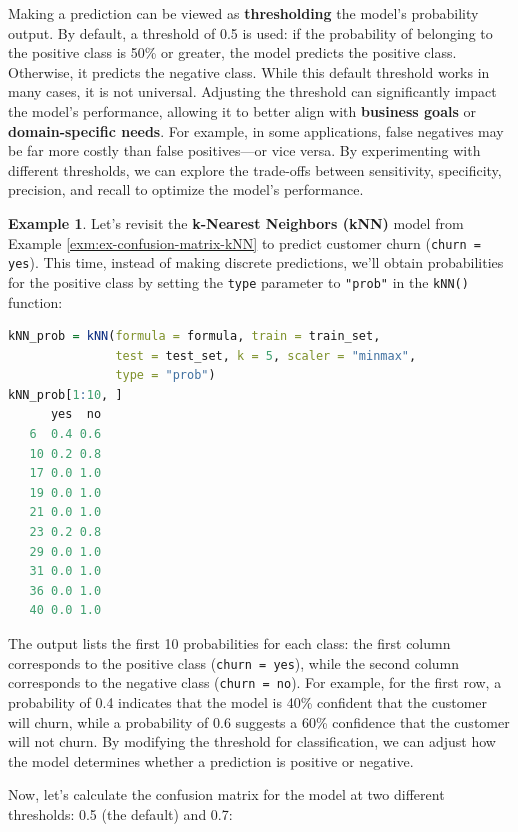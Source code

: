 \documentclass[
]{book}
\newcommand{\passthrough}[1]{#1}
\theoremstyle{definition}
\theoremstyle{definition}
\newtheorem{example}{Example}[chapter]
\theoremstyle{definition}
\theoremstyle{definition}
\theoremstyle{remark}
\begin{document}
Making a prediction can be viewed as \textbf{thresholding} the model's probability output. By default, a threshold of 0.5 is used: if the probability of belonging to the positive class is 50\% or greater, the model predicts the positive class. Otherwise, it predicts the negative class. While this default threshold works in many cases, it is not universal. Adjusting the threshold can significantly impact the model's performance, allowing it to better align with \textbf{business goals} or \textbf{domain-specific needs}. For example, in some applications, false negatives may be far more costly than false positives---or vice versa. By experimenting with different thresholds, we can explore the trade-offs between sensitivity, specificity, precision, and recall to optimize the model's performance.

\begin{example}
\protect\hypertarget{exm:ex-confusion-matrix-kNN-prob}{}\label{exm:ex-confusion-matrix-kNN-prob}Let's revisit the \textbf{k-Nearest Neighbors (kNN)} model from Example \ref{exm:ex-confusion-matrix-kNN} to predict customer churn (\passthrough{\lstinline!churn = yes!}). This time, instead of making discrete predictions, we'll obtain probabilities for the positive class by setting the \passthrough{\lstinline!type!} parameter to \passthrough{\lstinline!"prob"!} in the \passthrough{\lstinline!kNN()!} function:

\begin{lstlisting}[language=R]
kNN_prob = kNN(formula = formula, train = train_set, 
               test = test_set, k = 5, scaler = "minmax",
               type = "prob")
kNN_prob[1:10, ]
      yes  no
   6  0.4 0.6
   10 0.2 0.8
   17 0.0 1.0
   19 0.0 1.0
   21 0.0 1.0
   23 0.2 0.8
   29 0.0 1.0
   31 0.0 1.0
   36 0.0 1.0
   40 0.0 1.0
\end{lstlisting}

The output lists the first 10 probabilities for each class: the first column corresponds to the positive class (\passthrough{\lstinline!churn = yes!}), while the second column corresponds to the negative class (\passthrough{\lstinline!churn = no!}). For example, for the first row, a probability of 0.4 indicates that the model is 40\% confident that the customer will churn, while a probability of 0.6 suggests a 60\% confidence that the customer will not churn. By modifying the threshold for classification, we can adjust how the model determines whether a prediction is positive or negative.

Now, let's calculate the confusion matrix for the model at two different thresholds: 0.5 (the default) and 0.7:


\end{example}
\end{document}
